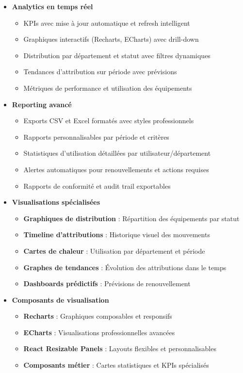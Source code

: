 \documentclass[12pt,a4paper]{report}
\begin{document}
\begin{itemize}
\item \textbf{Analytics en temps réel}
  \begin{itemize}

  \item KPIs avec mise à jour automatique et refresh intelligent
  \item Graphiques interactifs (Recharts, ECharts) avec drill-down
  \item Distribution par département et statut avec filtres dynamiques
  \item Tendances d'attribution sur période avec prévisions
  \item Métriques de performance et utilisation des équipements
  \end{itemize}

\item \textbf{Reporting avancé}
  \begin{itemize}

  \item Exports CSV et Excel formatés avec styles professionnels
  \item Rapports personnalisables par période et critères
  \item Statistiques d'utilisation détaillées par utilisateur/département
  \item Alertes automatiques pour renouvellements et actions requises
  \item Rapports de conformité et audit trail exportables
  \end{itemize}


\item \textbf{Visualisations spécialisées}
  \begin{itemize}
  \item \textbf{Graphiques de distribution} : Répartition des équipements par statut
  \item \textbf{Timeline d'attributions} : Historique visuel des mouvements
  \item \textbf{Cartes de chaleur} : Utilisation par département et période
  \item \textbf{Graphes de tendances} : Évolution des attributions dans le temps
  \item \textbf{Dashboards prédictifs} : Prévisions de renouvellement
\end{itemize}


\item \textbf{Composants de visualisation}
  \begin{itemize}
  \item \textbf{Recharts} : Graphiques composables et responsifs
  \item \textbf{ECharts} : Visualisations professionnelles avancées
  \item \textbf{React Resizable Panels} : Layouts flexibles et personnalisables
  \item \textbf{Composants métier} : Cartes statistiques et KPIs spécialisés
  \end{itemize}
\end{itemize}
\end{document}
